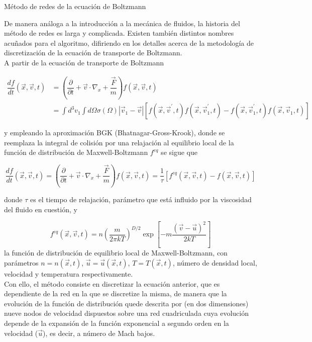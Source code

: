 \documentclass[12pt]{article}
\begin{document}
\begin {section} {Método de redes de la ecuación de Boltzmann} 

De manera análoga a la introducción a la mecánica de fluidos, la historia del método de redes es larga y complicada. Existen también distintos nombres acuñados para el algoritmo, difiriendo en los detalles acerca de la metodología de discretización de la ecuación de transporte de Boltzmann. 
\\
A partir de la ecuación de transporte de Boltzmann

\begin {align*}
\dfrac{df}{dt} \left(\Vec{x}, \Vec{v}, t\right) &= \left (\dfrac{\partial}{\partial t}+ \Vec{v}\cdot\nabla_{x} + \dfrac{\vec{F}}{m}\right)f \left(\Vec{x}, \Vec{v}, t\right)  \\
& =\int{d^{3}v_1\int{d\Omega \sigma (\Omega)|\Vec{v}_1-\Vec{v}|\left[f \left(\Vec{x}, \Vec{v}^{\prime}, t\right)f \left(\Vec{x}, \Vec{v}^{\prime}_{1}, t\right)-f \left(\Vec{x}, \Vec{v}^{\prime}_{1}, t\right)f \left(\Vec{x}, \Vec{v}_1, t\right)\right]}}
\end {align*}

y empleando la aproximación BGK (Bhatnagar-Gross-Krook), donde se reemplaza la integral de colisión por una relajación al equilibrio local de la función de distribución de Maxwell-Boltzmann $f^{eq}$ se sigue que

\begin {equation*}
\dfrac{df}{dt} \left(\Vec{x}, \Vec{v}, t\right) = \left (\dfrac{\partial}{\partial t}+ \Vec{v}\cdot\nabla_{x} + \dfrac{\vec{F}}{m}\right)f \left(\Vec{x}, \Vec{v}, t\right) = \dfrac{1}{\tau} \left[f^{eq} \left(\Vec{x}, \Vec{v}, t\right)-f \left(\Vec{x}, \Vec{v}, t\right)\right]
\end {equation*}

donde $\tau$ es el tiempo de relajación, parámetro que está influido por la viscosidad del fluido en cuestión, y 

\begin{equation*}
f^{eq} \left(\Vec{x}, \Vec{v}, t\right)  = n \left(\dfrac{m}{2\pi k T}\right)^{D/2}\exp{\left[-m\dfrac{(\Vec{v}-\Vec{u})^2}{2kT}\right]}
\end{equation*}
la función de distribución de equilibrio local de Maxwell-Boltzmann, con parámetros
$n = n \left(\Vec{x},t\right)$, $\Vec{u} = \Vec{u} \left(\Vec{x},t\right)$, $T = T \left(\Vec{x},t\right)$, número de densidad local, velocidad y temperatura respectivamente.
\\
Con ello, el método consiste en discretizar la ecuación anterior, que es dependiente de la red en la que se discretize la misma, de manera que la evolución de la función de distribución quede descrita por (en dos dimensiones) nueve nodos de velocidad dispuestos sobre una red cuadriculada cuya evolución depende de la expansión de la función exponencial a segundo orden en la velocidad ($\Vec{u}$), es decir, a número de Mach bajos. 


\end{section}
\end{document}
